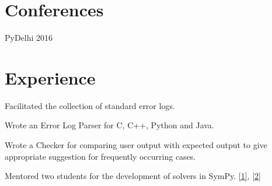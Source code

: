 \documentclass[]{deedy-resume-openfont}
\begin{document}
\begin{minipage}[t]{0.33\textwidth}

\section{Conferences}
\textbullet{} PyDelhi 2016 \\
\sectionsep

%
%

\end{minipage} 
\hfill
\begin{minipage}[t]{0.66\textwidth} 


\section{Experience}

\vspace{\topsep} %
\sectionsep

\vspace{\topsep} %
\begin{tightemize}
\item Facilitated the collection of standard error logs.
\item Wrote an Error Log Parser for C, C++, Python and Java.
\item Wrote a Checker for comparing user output with expected output to give appropriate suggestion for frequently occurring cases. 
\end{tightemize}
\sectionsep

\vspace{\topsep} %
\begin{tightemize}\item Mentored two students for the development of solvers in SymPy. \href{https://summerofcode.withgoogle.com/projects/#6299625891823616}{[1]}, 
\href{https://summerofcode.withgoogle.com/projects/#5440294841483264}{[2]}
\end{tightemize}
\sectionsep


\end{minipage}
\end{document}
